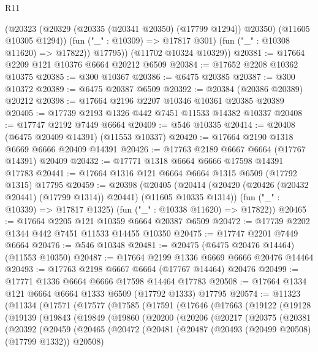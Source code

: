 \begin{lexlean}{R11}
\begin{coremodule}
{{{{{{{{{{{{{{{{{{{{{{{{{{{{{{{{{{{{{{{{{{{{{{{{{{{{{{{{{{{{{{{{{{{{{{{{{{{{{{{{{{            (@20323 (@20329 (@20335 (@20341 @20350) (@17799 @1294)) @20350) (@11605 @10305 @1294))
            (fun ("_" : @10309) => @17817 @301)
            (fun ("_" : @10308 @11620) => @17822))
          @17795))
      (@11702 @10324 @10329))
@20381 := @17664 @2209 @121 @10376 @6664 @20212 @6509
@20384 := @17652 @2208 @10362 @10375
@20385 := @300 @10367
@20386 := @6475 @20385
@20387 := @300 @10372
@20389 := @6475 @20387 @6509
@20392 := @20384 (@20386 @20389) @20212
@20398 := @17664 @2196 @2207 @10346 @10361 @20385 @20389
@20405 := @17739 @2193 @1326 @442 @7451 @11533 @14382 @10337
@20408 := @17747 @2192 @7449 @6664
@20409 := @546 @10335
@20414 := @20408 (@6475 @20409 @14391) (@11553 @10337)
@20420 := @17664 @2190 @1318 @6669 @6666 @20409 @14391
@20426 := @17763 @2189 @6667 @6664 (@17767 @14391) @20409
@20432 := @17771 @1318 @6664 @6666 @17598 @14391 @17783
@20441 := @17664 @1316 @121 @6664 @6664 @1315 @6509 (@17792 @1315) @17795
@20459 := @20398
    (@20405
      (@20414 (@20420 (@20426 (@20432 @20441) (@17799 @1314)) @20441) (@11605 @10335 @1314))
      (fun ("_" : @10339) => @17817 @1325)
      (fun ("_" : @10338 @11620) => @17822))
@20465 := @17664 @2205 @121 @10359 @6664 @20387 @6509
@20472 := @17739 @2202 @1344 @442 @7451 @11533 @14455 @10350
@20475 := @17747 @2201 @7449 @6664
@20476 := @546 @10348
@20481 := @20475 (@6475 @20476 @14464) (@11553 @10350)
@20487 := @17664 @2199 @1336 @6669 @6666 @20476 @14464
@20493 := @17763 @2198 @6667 @6664 (@17767 @14464) @20476
@20499 := @17771 @1336 @6664 @6666 @17598 @14464 @17783
@20508 := @17664 @1334 @121 @6664 @6664 @1333 @6509 (@17792 @1333) @17795
@20574 := @11323
    (@11334
      (@17571
        (@17577
          (@17585
            (@17591
              (@17646
                (@17663
                  (@19122
                    (@19128
                      (@19139
                        (@19843
                          (@19849
                            (@19860
                              (@20200
                                (@20206
                                  (@20217
                                    (@20375
                                      (@20381
                                        (@20392
                                          (@20459
                                            (@20465
                                              (@20472
                                                (@20481
                                                  (@20487
                                                    (@20493 (@20499 @20508) (@17799 @1332))
                                                    @20508)
}}}}}}}}}}}}}}}}}}}}}}}}}}}}}}}}}}}}}}}}}}}}}}}}}}}}}}}}}}}}}}}}}}}}}}}}}}}}}}}}}}
\end{coremodule}
\end{lexlean}
